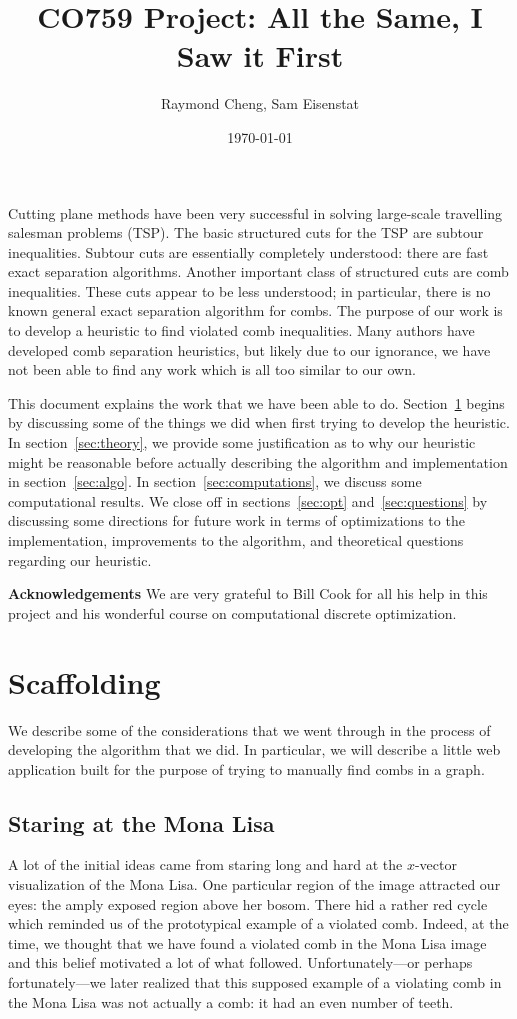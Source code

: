 \documentclass[12pt, letterpaper]{amsart}
\title{CO759 Project: All the Same, I Saw it First}
\author{Raymond Cheng, Sam Eisenstat}
\date{\today}
\theoremstyle{plain}
\theoremstyle{definition}
\theoremstyle{remark}
\begin{document}
\maketitle
Cutting plane methods have been very successful in solving large-scale
travelling salesman problems (TSP). The basic structured cuts for the TSP are
subtour inequalities. Subtour cuts are essentially completely understood: there
are fast exact separation algorithms.  Another important class of structured
cuts are comb inequalities. These cuts appear to be less understood; in
particular, there is no known general exact separation algorithm for combs.
The purpose of our work is to develop a heuristic to find violated comb
inequalities.  Many authors have developed comb separation heuristics, but
likely due to our ignorance, we have not been able to find any work which is
all too similar to our own.

This document explains the work that we have been able to do.
Section~\ref{sec:scaffolding} begins by discussing some of the things we did
when first trying to develop the heuristic. In section~\ref{sec:theory}, we
provide some justification as to why our heuristic might be reasonable before
actually describing the algorithm and implementation in section~\ref{sec:algo}.
In section~\ref{sec:computations}, we discuss some computational results.  We
close off in sections~\ref{sec:opt} and~\ref{sec:questions} by discussing some
directions for future work in terms of optimizations to the implementation,
improvements to the algorithm, and theoretical questions regarding our
heuristic.

\noindent\textbf{Acknowledgements} We are very grateful to Bill Cook for all
his help in this project and his wonderful course on computational discrete
optimization.

\section{Scaffolding}\label{sec:scaffolding}
We describe some of the considerations that we went through in the process of
developing the algorithm that we did. In particular, we will describe a little
web application built for the purpose of trying to manually find combs in a graph.

\subsection{Staring at the Mona Lisa}
A lot of the initial ideas came from staring long and hard at the $x$-vector
visualization of the Mona Lisa. One particular region of the image attracted
our eyes: the amply exposed region above her bosom. There hid a rather red
cycle which reminded us of the prototypical example of a violated comb. Indeed,
at the time, we thought that we have found a violated comb in the Mona Lisa
image and this belief motivated a lot of what followed. Unfortunately---or perhaps
fortunately---we later realized that this supposed example of a violating comb
in the Mona Lisa was not actually a comb: it had an even number of teeth.
\end{document}
